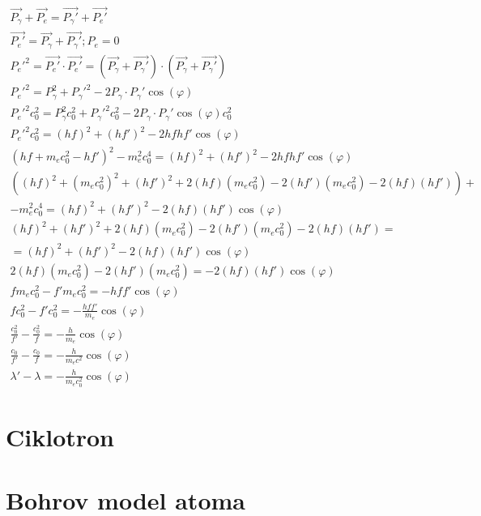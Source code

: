\documentclass[a4paper,12pt]{article}
\begin{document}
\subsection{}
\begin{align}
    \vec{P_\gamma} + \vec{P_e} = \vec{P_\gamma'} + \vec{P_e'} \\
    \vec{P_e'} = \vec{P_\gamma} + \vec{P_\gamma'}; P_e = 0 \\
    P_e'^2 = \vec{P_e'} \cdot \vec{P_e'} = (\vec{P_\gamma} + \vec{P_\gamma'}) \cdot (\vec{P_\gamma} + \vec{P_\gamma'}) \\
    P_e'^2 = P_\gamma^2 + P_\gamma'^2 - 2P_\gamma \cdot P_\gamma' \cos(\varphi) \\
    P_e'^2 c_0^2 = P_\gamma^2 c_0^2 + P_\gamma'^2 c_0^2 - 2P_\gamma \cdot P_\gamma' \cos(\varphi) c_0^2 \\
    P_e'^2 c_0^2 = (hf)^2 + (hf')^2 - 2hf hf' \cos(\varphi) \\
    (hf + m_e c_0^2 - hf')^2 - m_e^2 c_0^4  = (hf)^2 + (hf')^2 - 2hf hf' \cos(\varphi) \\
    ((hf)^2 + (m_e c_0^2)^2 + (hf')^2 + 2(hf)(m_e c_0^2) - 2(hf')(m_e c_0^2) - 2(hf)(hf')) + \nonumber \\
    - m_e^2 c_0^4 = (hf)^2 + (hf')^2 - 2(hf)(hf') \cos(\varphi) \\
    (hf)^2 + (hf')^2 + 2(hf)(m_e c_0^2) - 2(hf')(m_e c_0^2) - 2(hf)(hf') = \nonumber \\
    = (hf)^2 + (hf')^2 - 2(hf)(hf') \cos(\varphi) \\
    2(hf)(m_e c_0^2) - 2(hf')(m_e c_0^2) = -2(hf)(hf') \cos(\varphi) \\
    f m_e c_0^2 - f' m_e c_0^2 = - h f f' \cos(\varphi) \\
    f c_0^2 - f' c_0^2 = - \frac{h f f'}{m_e} \cos(\varphi) \\
    \frac{c_0^2}{f'} - \frac{c_0^2}{f} = - \frac{h}{m_e} \cos(\varphi) \\
    \frac{c_0}{f'} - \frac{c_0}{f} = - \frac{h}{m_e c^2} \cos(\varphi) \\
    \lambda' - \lambda = - \frac{h}{m_e c_0^2} \cos(\varphi)
\end{align}


\newpage
\section{Ciklotron}

\newpage
\section{Bohrov model atoma}
\end{document}
